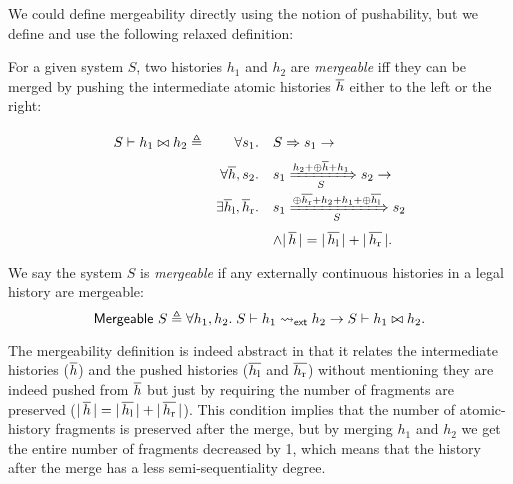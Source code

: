 \documentclass[sigplan,10pt,review,anonymous,screen]{acmart}\settopmatter{printfolios=true,printccs=false,printacmref=false}
\begin{document}
We could define mergeability directly using the notion of pushability, but we define and use the following relaxed definition:
\begin{definition}
  For a given system $S$, two histories $h_1$ and $h_2$ are \emph{mergeable} iff they can be merged by pushing the intermediate atomic histories $\overline{h}$ either to the left or the right:
  \begin{displaymath}
    \renewcommand{\arraystretch}{1.9}
    \begin{array}{rrl}
      \hmgb{S}{h_1}{h_2} \triangleq & \forall s_1. & \semrch{S}{s_1} \to\\
      & \forall \listof{h}, s_2. & \semsteps{S}{s_1}{\listapp{h_2}{\listapp{\listconcat{\listof{h}}}{h_1}}}{s_2} \to\\
      & \exists \listof{h}_{\textrm{l}}, \listof{h}_{\textrm{r}}. & \semsteps{S}{s_1}{\listapp{\listconcat{\listof{h_{\textrm{r}}}}}{\listapp{h_2}{\listapp{h_1}{\listconcat{\listof{h_{\textrm{l}}}}}}}}{s_2}\\
      & & \wedge \sizeof{\listof{h}} = \sizeof{\listof{h_{\textrm{l}}}} + \sizeof{\listof{h_{\textrm{r}}}}.
    \end{array}
  \end{displaymath}
  We say the system $S$ is \emph{mergeable} if any externally continuous histories in a legal history are mergeable:
  \begin{displaymath}
    \mathsf{Mergeable}\ S \triangleq \forall h_1, h_2.\; S \vdash h_1 \leadsto_{\textsf{ext}} h_2 \to S \vdash h_1 \bowtie h_2.
  \end{displaymath}
\end{definition}

The mergeability definition is indeed abstract in that it relates the intermediate histories ($\overline{h}$) and the pushed histories ($\overline{h_{\textrm{l}}}$ and $\overline{h_{\textrm{r}}}$) without mentioning they are indeed pushed from $\overline{h}$ but just by requiring the number of fragments are preserved ($|\, \overline{h}\, | = |\, \overline{h_{\textrm{l}}}\, | + |\, \overline{h_{\textrm{r}}}\, |$).
This condition implies that the number of atomic-history fragments is preserved after the merge, but by merging $h_1$ and $h_2$ we get the entire number of fragments decreased by 1, which means that the history after the merge has a less semi-sequentiality degree.
\end{document}
